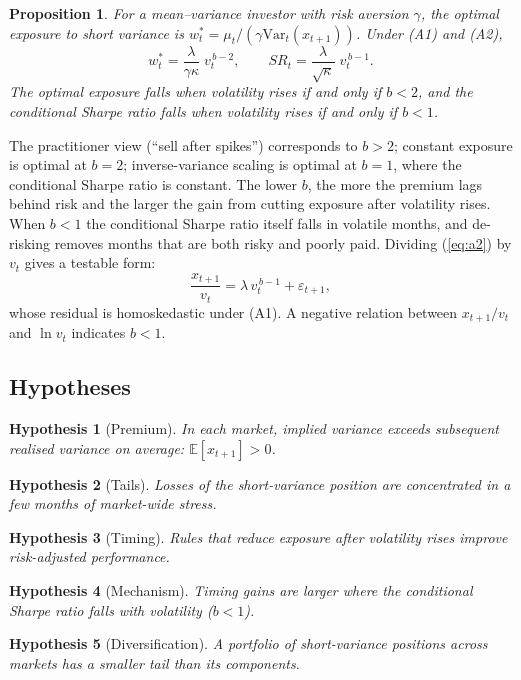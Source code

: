 \documentclass[11pt,a4paper]{article}
\newtheorem{hypothesis}{Hypothesis}
\newtheorem{proposition}{Proposition}
\theoremstyle{remark}
\newcommand{\E}{\mathbb{E}}
\newcommand{\Var}{\mathrm{Var}}
\begin{document}
\begin{proposition}
\label{prop:weight}
For a mean--variance investor with risk aversion $\gamma$, the optimal exposure to short variance is $w_t^{*}=\mu_t/(\gamma\Var_t(x_{t+1}))$. Under (A1) and (A2),
\begin{equation}
w_t^{*} = \frac{\lambda}{\gamma\kappa}\; v_t^{\,b-2},
\qquad
SR_t = \frac{\lambda}{\sqrt{\kappa}}\; v_t^{\,b-1}.
\label{eq:wstar}
\end{equation}
The optimal exposure falls when volatility rises if and only if $b<2$, and the conditional Sharpe ratio falls when volatility rises if and only if $b<1$.
\end{proposition}

The practitioner view (``sell after spikes'') corresponds to $b>2$; constant exposure is optimal at $b=2$; inverse-variance scaling \citep{moreiramuir2017} is optimal at $b=1$, where the conditional Sharpe ratio is constant. The lower $b$, the more the premium lags behind risk and the larger the gain from cutting exposure after volatility rises. When $b<1$ the conditional Sharpe ratio itself falls in volatile months, and de-risking removes months that are both risky and poorly paid. Dividing (\ref{eq:a2}) by $v_t$ gives a testable form:
\begin{equation}
\frac{x_{t+1}}{v_t} = \lambda\, v_t^{\,b-1} + \varepsilon_{t+1},
\label{eq:test}
\end{equation}
whose residual is homoskedastic under (A1). A negative relation between $x_{t+1}/v_t$ and $\ln v_t$ indicates $b<1$.

\subsection*{Hypotheses}

\begin{hypothesis}[Premium]\label{h:premium}
In each market, implied variance exceeds subsequent realised variance on average: $\E[x_{t+1}]>0$.
\end{hypothesis}
\begin{hypothesis}[Tails]\label{h:tail}
Losses of the short-variance position are concentrated in a few months of market-wide stress.
\end{hypothesis}
\begin{hypothesis}[Timing]\label{h:timing}
Rules that reduce exposure after volatility rises improve risk-adjusted performance.
\end{hypothesis}
\begin{hypothesis}[Mechanism]\label{h:mech}
Timing gains are larger where the conditional Sharpe ratio falls with volatility ($b<1$).
\end{hypothesis}
\begin{hypothesis}[Diversification]\label{h:div}
A portfolio of short-variance positions across markets has a smaller tail than its components.
\end{hypothesis}
\end{document}
